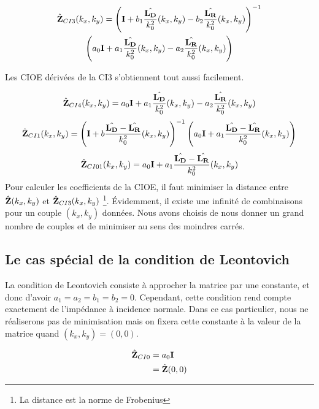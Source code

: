     \begin{multline}
        \hat{\mathbf{Z}}_{CI3}(k_x,k_y) = \left(\mathbf{I} + b_1 \dfrac{\hat{\mathbf{L_D}}}{k_0^2}(k_x,k_y) - b_2 \dfrac{\hat{\mathbf{L_R}}}{k_0^2}(k_x,k_y) \right)^{-1}
        \\
        \left(a_0 \mathbf{I} + a_1 \dfrac{\hat{\mathbf{L_D}}}{k_0^2}(k_x,k_y) - a_2 \dfrac{\hat{\mathbf{L_R}}}{k_0^2}(k_x,k_y)\right)
    \end{multline}

    Les CIOE dérivées de la CI3 s'obtiennent tout aussi facilement.

    \begin{equation}
        \hat{\mathbf{Z}}_{CI4}(k_x,k_y) = a_0 \mathbf{I} + a_1 \dfrac{\hat{\mathbf{L_D}}}{k_0^2}(k_x,k_y) - a_2 \dfrac{\hat{\mathbf{L_R}}}{k_0^2}(k_x,k_y)
    \end{equation}
    \begin{equation}
        \hat{\mathbf{Z}}_{CI1}(k_x,k_y) =  \left(\mathbf{I} + b \dfrac{\hat{\mathbf{L_D}} - \hat{\mathbf{L_R}}}{k_0^2}(k_x,k_y) \right)^{-1}\left(a_0\mathbf{I} + a_1 \dfrac{\hat{\mathbf{L_D}} - \hat{\mathbf{L_R}}}{k_0^2}(k_x,k_y) \right)
    \end{equation}
    \begin{equation}
        \hat{\mathbf{Z}}_{CI01}(k_x,k_y) =  a_0\mathbf{I} + a_1 \dfrac{\hat{\mathbf{L_D}} - \hat{\mathbf{L_R}}}{k_0^2}(k_x,k_y)
    \end{equation}
    Pour calculer les coefficients de la CIOE, il faut minimiser la distance entre \(\hat{\mathbf{Z}}(k_x,k_y)\) et \(\hat{\mathbf{Z}}_{CI3}(k_x,k_y)\) \footnote{La distance est la norme de Frobenius}. Évidemment, il existe une infinité de combinaisons pour un couple \((k_x,k_y)\) données. Nous avons choisis de nous donner un grand nombre de couples et de minimiser au sens des moindres carrés.

  \subsection{Le cas spécial de la condition de Leontovich}

    La condition de Leontovich consiste à approcher la matrice par une constante, et donc d'avoir \(a_1=a_2=b_1=b_2=0\). Cependant, cette condition rend compte exactement de l'impédance à incidence normale. Dans ce cas particulier, nous ne réaliserons pas de minimisation mais on fixera cette constante à la valeur de la matrice quand \((k_x,k_y) = (0,0)\).

    \begin{align}
      \hat{\mathbf{Z}}_{CI0} & = a_0\mathbf{I} 
      \\
      &= \hat{\mathbf{Z}}(0,0)
    \end{align}